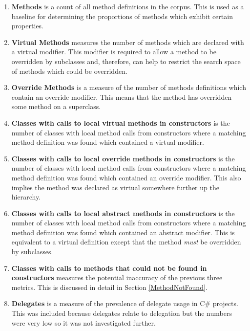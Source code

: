 \begin{enumerate}
	\item \textbf{Methods} is a count of all method definitions in the corpus. This is used as a baseline for determining the proportions of methods which exhibit certain properties.
	
	\item \textbf{Virtual Methods} measures the number of methods which are declared with a virtual modifier. This modifier is required to allow a method to be overridden by subclasses and, therefore, can help to restrict the search space of methods which could be overridden.
	
	\item \textbf{Override Methods} is a measure of the number of methods definitions which contain an override modifier. This means that the method has overridden some method on a superclass.
	
	\item \textbf{Classes with calls to local virtual methods in constructors} is the number of classes with local method calls from constructors where a matching method definition was found which contained a virtual modifier.
	
	\item \textbf{Classes with calls to local override methods in constructors} is the number of classes with local method calls from constructors where a matching method definition was found which contained an override modifier. This also implies the method was declared as virtual somewhere further up the hierarchy.
	
	\item \textbf{Classes with calls to local abstract methods in constructors}  is the number of classes with local method calls from constructors where a matching method definition was found which contained an abstract modifier. This is equivalent to a virtual definition except that the method \textit{must} be overridden by subclasses.
	
	\item \textbf{Classes with calls to methods that could not be found in constructors} measures the potential inaccuracy of the previous three metrics. This is discussed in detail in Section \ref{MethodNotFound}.
		
	\item \textbf{Delegates} is a measure of the prevalence of delegate usage in C\# projects. This was included because delegates relate to delegation but the numbers were very low so it was not investigated further.
\end{enumerate}

